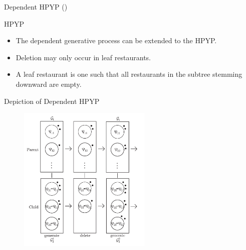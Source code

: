 \documentclass{beamer}
\begin{document}
\begin{frame}[t]{Dependent HPYP (\citet{Bartlett2010})}
	
	\begin{block}{HPYP}
		\begin{itemize}
			\item The dependent generative process can be extended to the HPYP.
			\item Deletion may only occur in leaf restaurants.
			\item A leaf restaurant is one such that all restaurants in the subtree stemming downward are empty.
		\end{itemize}

	\end{block}
\end{frame}

\begin{frame}[t] {Depiction of Dependent HPYP}
	\begin{figure}[t]
		\begin{center}
			\includegraphics[height = 7cm]{../figs/figure2.pdf}
		\end{center}
	\end{figure}
\end{frame}
\end{document}
